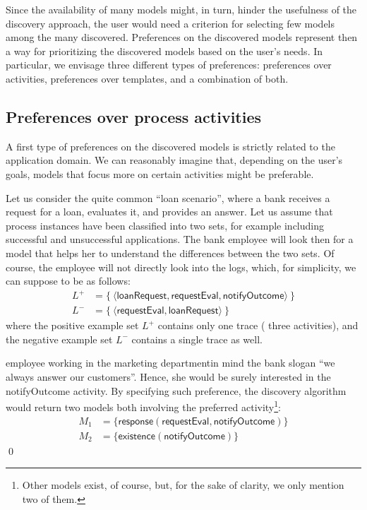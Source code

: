 Since the availability of many models might, in turn, hinder the usefulness of the discovery approach, the user would need a criterion for selecting few models among the many discovered.
%
Preferences on the discovered models represent then a way for prioritizing the discovered models based on the user's needs. In particular, we envisage three different types of preferences: preferences over activities, preferences over templates, and a combination of both.



\subsection{Preferences over process activities}
\label{subsec:prefOverActivities}

A first type of preferences on the discovered models is strictly related to the application domain. We can reasonably imagine that, depending on the user's goals, models that focus more on certain activities might be preferable.

\begin{example}
\label{ex:prefOverActivities}
Let us consider the quite common ``loan scenario'', where a bank receives a request for a loan, evaluates it, and provides an answer. Let us assume that process instances have been classified into two sets, for example including successful and unsuccessful applications. The bank employee will look then for a model that helps her to understand the differences between the two sets. Of course, the employee will not directly look into the logs, which, for simplicity, we can suppose to be as follows:
%
\begin{align*}
L^{+}& = \{\ \langle \mathsf{loanRequest}, \mathsf{requestEval}, \mathsf{notifyOutcome} \rangle \ \} \\
L^- & = \{\ \langle \mathsf{requestEval}, \mathsf{loanRequest} \rangle \ \}
\end{align*}
%
where the positive example set $L^+$ %
contains only one trace (
 three activities), and the negative example set $L^-$ %
 contains a single trace as well.

\noindent {}employee working in the marketing departmentin mind the bank slogan ``we always answer our customers''. Hence, she would be surely interested in the \textsf{notifyOutcome} activity. By specifying such preference, the discovery algorithm would return two models both involving the preferred activity\footnote{Other models exist, of course, but, for the sake of clarity, we only mention two of them.}:
%
\begin{align*}
M_1 & = \{ \mathsf{response(requestEval, notifyOutcome)}\} \\
M_2 & = \{ \mathsf{existence(notifyOutcome)}\}
\end{align*}
%
\qed
%
\end{example}

